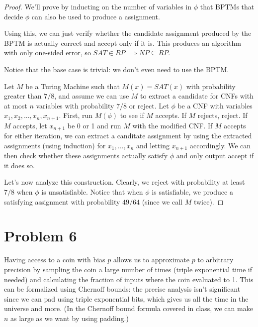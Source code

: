 \documentclass[usletter]{article}
\begin{document}
\begin{proof}
    We'll prove by inducting on the number of variables in $\phi$
    that BPTMs that decide $\phi$ can also be used to produce
    a assignment. 
    
    Using this, we can just verify whether
    the candidate assignment produced by the BPTM is actually correct
    and accept only if it is. This produces an algorithm with only
    one-sided error, so $SAT \in RP \implies NP \subseteq RP$.

    Notice that the base case is trivial: we don't even need to use
    the BPTM.

    Let $M$ be a Turing Machine such that $M(x) = SAT(x)$ with
    probability greater than $7/8$, and assume we can use $M$ to
    extract a candidate for CNFs with at most $n$ variables with
    probability $7/8$ or reject. Let $\phi$ be a CNF with variables
    $x_{1},x_{2},...,x_{n}, x_{n+1}$. First, run $M(\phi)$ to see
    if $M$ accepts. If $M$ rejects, reject. If $M$ accepts, let $x_{n+1}$ be 0 or 1
    and run $M$ with the modified CNF. If $M$ accepts for either iteration,
    we can extract a canditate assignment by using the extracted assignments
    (using induction) for $x_{1},...,x_{n}$ and letting $x_{n+1}$ accordingly.
    We can then check whether these assignments actually satisfy $\phi$
    and only output accept if it does so.

    Let's now analyze this construction. Clearly, we reject with probability
    at least $7/8$ when $\phi$ is unsatisfiable. Notice that when $\phi$
    is satisfiable, we produce a satisfying assignment with probability
    $49/64$ (since we call $M$ twice).
\end{proof}

\newpage

\section*{Problem 6}

Having access to a coin with bias $p$ allows us to
approximate $p$ to arbitrary precision by sampling
the coin a large number of times (triple exponential time if needed) 
and calculating the fraction of inputs where the coin evaluated to 1.
This can be formalized using Chernoff bounds: the precise analysis
isn't significant since we can pad using triple exponential bits,
which gives us all the time in the universe and more. (In the Chernoff
bound formula covered in class, we can make $n$ as large as we want by
using padding.)
\end{document}
